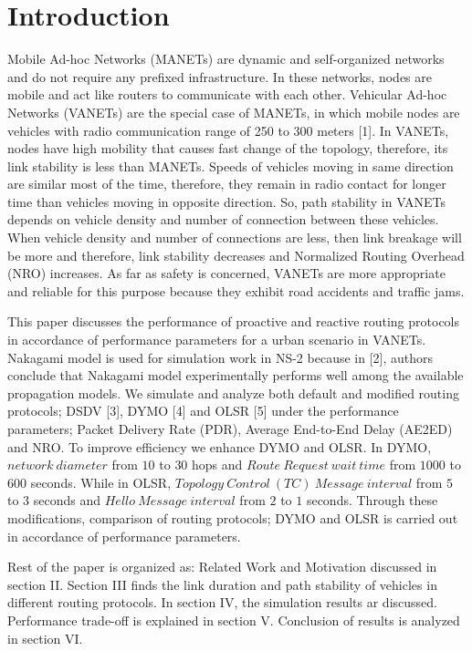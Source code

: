 \documentclass[journal]{IEEEtran}
\begin{document}
\section{Introduction}
Mobile Ad-hoc Networks (MANETs) are dynamic and self-organized networks and do not require any prefixed infrastructure. In these networks, nodes are mobile and act like routers to communicate with each other. Vehicular Ad-hoc Networks (VANETs) are the special case of MANETs, in which mobile nodes are vehicles with radio communication range of 250 to 300 meters [1]. In VANETs, nodes have high mobility that causes fast change of the topology, therefore, its link stability is less than MANETs. Speeds of vehicles moving in same direction are similar most of the time, therefore, they remain in radio contact for longer time than vehicles moving in opposite direction. So, path stability in VANETs depends on vehicle density and number of connection between these vehicles. When vehicle density and number of connections are less, then link breakage will be more and therefore, link stability decreases and Normalized Routing Overhead (NRO) increases. As far as safety is concerned, VANETs are more appropriate and reliable for this purpose because they exhibit road accidents and traffic jams.

This paper discusses the performance of proactive and reactive routing protocols in accordance of performance parameters for a urban scenario in VANETs. Nakagami model is used for simulation work in NS-2 because in [2], authors conclude that Nakagami model experimentally performs well among the available propagation models. We simulate and analyze both default and modified routing protocols; DSDV [3], DYMO [4] and OLSR [5] under the performance parameters; Packet Delivery Rate (PDR), Average End-to-End Delay (AE2ED) and NRO. To improve efficiency we enhance DYMO and OLSR. In DYMO, $network~diameter$ from $10$ to $30$ hops and $Route~Request~wait~time$ from $1000$ to $600$ seconds. While in OLSR, $Topology~Control~(TC)~Message~interval$ from $5$ to $3$ seconds and $Hello~Message~interval$ from $2$ to $1$ seconds. Through these modifications, comparison of routing protocols; DYMO and OLSR is carried out in accordance of performance parameters.

Rest of the paper is organized as: Related Work and Motivation discussed in section II. Section III finds the link duration and path stability of vehicles in different routing protocols. In section IV, the simulation results ar discussed. Performance trade-off is explained in section V. Conclusion of results is analyzed in section VI.
\end{document}
